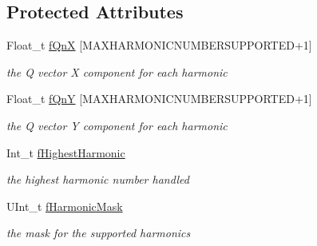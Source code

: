 \subsection*{Protected Attributes}
\begin{DoxyCompactItemize}
\item 
\mbox{\label{classQn_1_1CorrectionQnVector_a2ae659e3a1bb05acdc53befd228f8e21}} 
Float\+\_\+t \mbox{\hyperlink{classQn_1_1CorrectionQnVector_a2ae659e3a1bb05acdc53befd228f8e21}{f\+QnX}} \mbox{[}M\+A\+X\+H\+A\+R\+M\+O\+N\+I\+C\+N\+U\+M\+B\+E\+R\+S\+U\+P\+P\+O\+R\+T\+ED+1\mbox{]}
\begin{DoxyCompactList}\small\item\em the Q vector X component for each harmonic \end{DoxyCompactList}\item 
\mbox{\label{classQn_1_1CorrectionQnVector_a633fc0ceee269c905d852d12adb8f767}} 
Float\+\_\+t \mbox{\hyperlink{classQn_1_1CorrectionQnVector_a633fc0ceee269c905d852d12adb8f767}{f\+QnY}} \mbox{[}M\+A\+X\+H\+A\+R\+M\+O\+N\+I\+C\+N\+U\+M\+B\+E\+R\+S\+U\+P\+P\+O\+R\+T\+ED+1\mbox{]}
\begin{DoxyCompactList}\small\item\em the Q vector Y component for each harmonic \end{DoxyCompactList}\item 
\mbox{\label{classQn_1_1CorrectionQnVector_ad37b7d348ec4ba631a3829fe1dde8709}} 
Int\+\_\+t \mbox{\hyperlink{classQn_1_1CorrectionQnVector_ad37b7d348ec4ba631a3829fe1dde8709}{f\+Highest\+Harmonic}}
\begin{DoxyCompactList}\small\item\em the highest harmonic number handled \end{DoxyCompactList}\item 
\mbox{\label{classQn_1_1CorrectionQnVector_a11c90eb2e5d463bbb6669bf1cd845b71}} 
U\+Int\+\_\+t \mbox{\hyperlink{classQn_1_1CorrectionQnVector_a11c90eb2e5d463bbb6669bf1cd845b71}{f\+Harmonic\+Mask}}
\begin{DoxyCompactList}\small\item\em the mask for the supported harmonics \end{DoxyCompactList}\item 

\end{DoxyCompactItemize}
